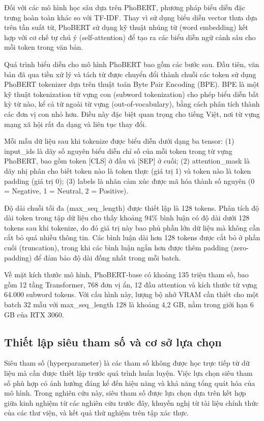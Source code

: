 \documentclass[14pt, a4paper]{report}
\begin{document}
Đối với các mô hình học sâu dựa trên PhoBERT, phương pháp biểu diễn đặc trưng hoàn toàn khác so với TF-IDF. Thay vì sử dụng biểu diễn vector thưa dựa trên tần suất từ, PhoBERT sử dụng kỹ thuật nhúng từ (word embedding) kết hợp với cơ chế tự chú ý (self-attention) để tạo ra các biểu diễn ngữ cảnh sâu cho mỗi token trong văn bản.


Quá trình biểu diễn cho mô hình PhoBERT bao gồm các bước sau. Đầu tiên, văn bản đã qua tiền xử lý và tách từ được chuyển đổi thành chuỗi các token sử dụng PhoBERT tokenizer dựa trên thuật toán Byte Pair Encoding (BPE). BPE là một kỹ thuật tokenization từ vựng con (subword tokenization) cho phép biểu diễn bất kỳ từ nào, kể cả từ ngoài từ vựng (out-of-vocabulary), bằng cách phân tích thành các đơn vị con nhỏ hơn. Điều này đặc biệt quan trọng cho tiếng Việt, nơi từ vựng mạng xã hội rất đa dạng và liên tục thay đổi.


Mỗi mẫu dữ liệu sau khi tokenize được biểu diễn dưới dạng ba tensor: (1) input\_ids là dãy số nguyên biểu diễn chỉ số của mỗi token trong từ vựng PhoBERT, bao gồm token [CLS] ở đầu và [SEP] ở cuối; (2) attention\_mask là dãy nhị phân cho biết token nào là token thực (giá trị 1) và token nào là token padding (giá trị 0); (3) labels là nhãn cảm xúc được mã hóa thành số nguyên (0 = Negative, 1 = Neutral, 2 = Positive).


Độ dài chuỗi tối đa (max\_seq\_length) được thiết lập là 128 tokens. Phân tích độ dài token trong tập dữ liệu cho thấy khoảng 94\% bình luận có độ dài dưới 128 tokens sau khi tokenize, do đó giá trị này bao phủ phần lớn dữ liệu mà không cần cắt bỏ quá nhiều thông tin. Các bình luận dài hơn 128 tokens được cắt bỏ ở phần cuối (truncation), trong khi các bình luận ngắn hơn được thêm padding (zero-padding) để đảm bảo độ dài đồng nhất trong mỗi batch.


Về mặt kích thước mô hình, PhoBERT-base có khoảng 135 triệu tham số, bao gồm 12 tầng Transformer, 768 đơn vị ẩn, 12 đầu attention và kích thước từ vựng 64.000 subword tokens. Với cấu hình này, lượng bộ nhớ VRAM cần thiết cho một batch 32 mẫu với max\_seq\_length 128 là khoảng 4,2 GB, nằm trong giới hạn 6 GB của RTX 3060.


\subsection{Thiết lập siêu tham số và cơ sở lựa chọn}


Siêu tham số (hyperparameter) là các tham số không được học trực tiếp từ dữ liệu mà cần được thiết lập trước quá trình huấn luyện. Việc lựa chọn siêu tham số phù hợp có ảnh hưởng đáng kể đến hiệu năng và khả năng tổng quát hóa của mô hình. Trong nghiên cứu này, siêu tham số được lựa chọn dựa trên kết hợp giữa kinh nghiệm từ các nghiên cứu trước đây, khuyến nghị từ tài liệu chính thức của các thư viện, và kết quả thử nghiệm trên tập xác thực.
\end{document}
